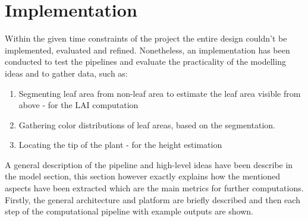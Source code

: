 \clearpage
\section{Implementation}\label{sec:implementation-and-evaluation}


Within the given time constraints of the project the entire design couldn't be implemented, evaluated and refined.
Nonetheless, an implementation has been conducted to test the pipelines and evaluate the practicality of the modelling ideas
and to gather data, such as:

\begin{enumerate}
    \item Segmenting leaf area from non-leaf area to estimate the leaf area visible from above - for the LAI computation
    \item Gathering color distributions of leaf areas, based on the segmentation.
    \item Locating the tip of the plant - for the height estimation
\end{enumerate}

A general description of the pipeline and high-level ideas have been describe in the model section, this
section however exactly explains how the mentioned aspects have been extracted which are the main metrics for
further computations.\\

Firstly, the general architecture and platform are briefly described and then each step of the computational
pipeline with example outputs are shown.